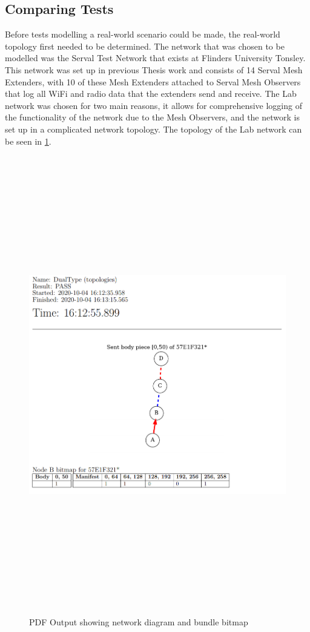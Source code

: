 \subsection{Comparing Tests}
Before tests modelling a real-world scenario could be made, the real-world topology first needed to be determined.
The network that was chosen to be modelled was the Serval Test Network that exists at Flinders University Tonsley.
This network was set up in previous Thesis work  and consists of 14 Serval Mesh Extenders, with 10 of these Mesh Extenders attached to Serval Mesh Observers that log all WiFi and radio data that the extenders send and receive.
The Lab network was chosen for two main reasons, it allows for comprehensive logging of the functionality of the network due to the Mesh Observers, and the network is set up in a complicated network topology.
The topology of the Lab network can be seen in \figurename{ \ref{fig:chapter6LabNetwork}}.




\begin{figure}
    \begin{centering}
        \includegraphics[width=15cm,height=20cm,keepaspectratio]{Figures/Chapter6-PDFPartition.png}
        \caption{PDF Output showing network diagram and bundle bitmap}
        \label{fig:chapter6LabNetwork}
    \end{centering}
\end{figure}


